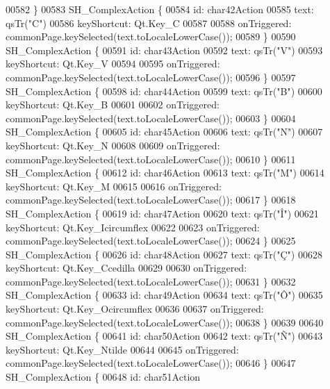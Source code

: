 \begin{DoxyCode}
00582     \}
00583     SH\_ComplexAction \{
00584         \textcolor{keywordtype}{id}: char42Action
00585         text: qsTr(\textcolor{stringliteral}{"C"})
00586         keyShortcut: Qt.Key\_C
00587 
00588         onTriggered: commonPage.keySelected(text.toLocaleLowerCase());
00589     \}
00590     SH\_ComplexAction \{
00591         \textcolor{keywordtype}{id}: char43Action
00592         text: qsTr(\textcolor{stringliteral}{"V"})
00593         keyShortcut: Qt.Key\_V
00594 
00595         onTriggered: commonPage.keySelected(text.toLocaleLowerCase());
00596     \}
00597     SH\_ComplexAction \{
00598         \textcolor{keywordtype}{id}: char44Action
00599         text: qsTr(\textcolor{stringliteral}{"B"})
00600         keyShortcut: Qt.Key\_B
00601 
00602         onTriggered: commonPage.keySelected(text.toLocaleLowerCase());
00603     \}
00604     SH\_ComplexAction \{
00605         \textcolor{keywordtype}{id}: char45Action
00606         text: qsTr(\textcolor{stringliteral}{"N"})
00607         keyShortcut: Qt.Key\_N
00608 
00609         onTriggered: commonPage.keySelected(text.toLocaleLowerCase());
00610     \}
00611     SH\_ComplexAction \{
00612         \textcolor{keywordtype}{id}: char46Action
00613         text: qsTr(\textcolor{stringliteral}{"M"})
00614         keyShortcut: Qt.Key\_M
00615 
00616         onTriggered: commonPage.keySelected(text.toLocaleLowerCase());
00617     \}
00618     SH\_ComplexAction \{
00619         \textcolor{keywordtype}{id}: char47Action
00620         text: qsTr(\textcolor{stringliteral}{"Î"})
00621         keyShortcut: Qt.Key\_Icircumflex
00622 
00623         onTriggered: commonPage.keySelected(text.toLocaleLowerCase());
00624     \}
00625     SH\_ComplexAction \{
00626         \textcolor{keywordtype}{id}: char48Action
00627         text: qsTr(\textcolor{stringliteral}{"Ç"})
00628         keyShortcut: Qt.Key\_Ccedilla
00629 
00630         onTriggered: commonPage.keySelected(text.toLocaleLowerCase());
00631     \}
00632     SH\_ComplexAction \{
00633         \textcolor{keywordtype}{id}: char49Action
00634         text: qsTr(\textcolor{stringliteral}{"Ô"})
00635         keyShortcut: Qt.Key\_Ocircumflex
00636 
00637         onTriggered: commonPage.keySelected(text.toLocaleLowerCase());
00638     \}
00639 
00640     SH\_ComplexAction \{
00641         \textcolor{keywordtype}{id}: char50Action
00642         text: qsTr(\textcolor{stringliteral}{"Ñ"})
00643         keyShortcut: Qt.Key\_Ntilde
00644 
00645         onTriggered: commonPage.keySelected(text.toLocaleLowerCase());
00646     \}
00647     SH\_ComplexAction \{
00648         \textcolor{keywordtype}{id}: char51Action

\end{DoxyCode}
